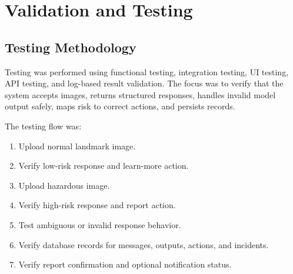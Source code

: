 \chapter{Validation and Testing}

\section{Testing Methodology}
Testing was performed using functional testing, integration testing, UI testing, API testing, and log-based result validation. The focus was to verify that the system accepts images, returns structured responses, handles invalid model output safely, maps risk to correct actions, and persists records.

The testing flow was:
\begin{enumerate}
\item Upload normal landmark image.
\item Verify low-risk response and learn-more action.
\item Upload hazardous image.
\item Verify high-risk response and report action.
\item Test ambiguous or invalid response behavior.
\item Verify database records for messages, outputs, actions, and incidents.
\item Verify report confirmation and optional notification status.
\end{enumerate}

